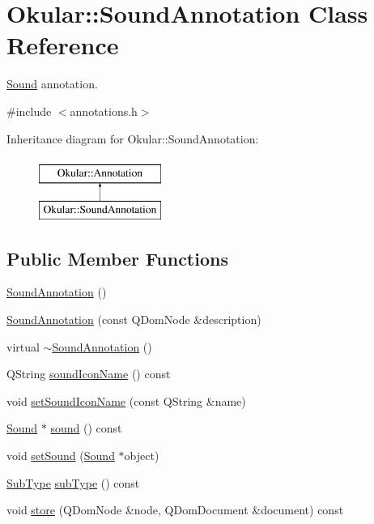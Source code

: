 \hypertarget{classOkular_1_1SoundAnnotation}{\section{Okular\+:\+:Sound\+Annotation Class Reference}
\label{classOkular_1_1SoundAnnotation}
}


\hyperlink{classOkular_1_1Sound}{Sound} annotation.  




{\ttfamily \#include $<$annotations.\+h$>$}

Inheritance diagram for Okular\+:\+:Sound\+Annotation\+:\begin{figure}[H]
\begin{center}
\leavevmode
\includegraphics[height=2.000000cm]{classOkular_1_1SoundAnnotation}
\end{center}
\end{figure}
\subsection*{Public Member Functions}
\begin{DoxyCompactItemize}
\item 
\hyperlink{classOkular_1_1SoundAnnotation_af0c5bb389c8e0768d34fafc9324f3275}{Sound\+Annotation} ()
\item 
\hyperlink{classOkular_1_1SoundAnnotation_abf2b78996e6ff7b94bc951a0087801e6}{Sound\+Annotation} (const Q\+Dom\+Node \&description)
\item 
virtual \hyperlink{classOkular_1_1SoundAnnotation_a5840cfe8d1e7762340ce9ba602a71051}{$\sim$\+Sound\+Annotation} ()
\item 
Q\+String \hyperlink{classOkular_1_1SoundAnnotation_a1dba0c2e63a69632479d3cb5fd5e11c0}{sound\+Icon\+Name} () const 
\item 
void \hyperlink{classOkular_1_1SoundAnnotation_a31cff8844c1f44ba429aaa5b19ae0174}{set\+Sound\+Icon\+Name} (const Q\+String \&name)
\item 
\hyperlink{classOkular_1_1Sound}{Sound} $\ast$ \hyperlink{classOkular_1_1SoundAnnotation_a8bcdec0ddd5970647944ca517f6580da}{sound} () const 
\item 
void \hyperlink{classOkular_1_1SoundAnnotation_addaf9b30f0d8bd216d3738c278bcdd24}{set\+Sound} (\hyperlink{classOkular_1_1Sound}{Sound} $\ast$object)
\item 
\hyperlink{classOkular_1_1Annotation_af71b46e37d5f850b97d5c4de3be9aac0}{Sub\+Type} \hyperlink{classOkular_1_1SoundAnnotation_a497aa4b131db0f95f690cfd729c89b6b}{sub\+Type} () const 
\item 
void \hyperlink{classOkular_1_1SoundAnnotation_ac70b0043016b8311d5eeff3334491826}{store} (Q\+Dom\+Node \&node, Q\+Dom\+Document \&document) const 
\end{DoxyCompactItemize}
